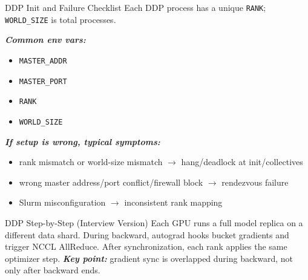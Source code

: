 \documentclass[12pt]{article}
\let\origtextbf\textbf
\renewcommand{\textbf}[1]{\origtextbf{\textit{#1}}}
\begin{document}
\begin{bluebox}{DDP Init and Failure Checklist}
Each DDP process has a unique \texttt{RANK}; \texttt{WORLD\_SIZE} is total processes.

\textbf{Common env vars:}
\begin{itemize}
\item \texttt{MASTER\_ADDR}
\item \texttt{MASTER\_PORT}
\item \texttt{RANK}
\item \texttt{WORLD\_SIZE}
\end{itemize}

\textbf{If setup is wrong, typical symptoms:}
\begin{itemize}
\item rank mismatch or world-size mismatch \(\rightarrow\) hang/deadlock at init/collectives
\item wrong master address/port conflict/firewall block \(\rightarrow\) rendezvous failure
\item Slurm misconfiguration \(\rightarrow\) inconsistent rank mapping
\end{itemize}
\end{bluebox}

\begin{bluebox}{DDP Step-by-Step (Interview Version)}
Each GPU runs a full model replica on a different data shard. During backward, autograd hooks bucket gradients and trigger NCCL AllReduce. After synchronization, each rank applies the same optimizer step.  
\textbf{Key point:} gradient sync is overlapped during backward, not only after backward ends.
\end{bluebox}
\end{document}
